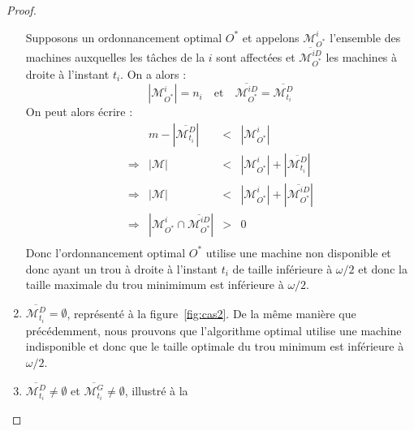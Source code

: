 \documentclass[a4paper,9pt]{article}
\begin{document}
\begin{proof}
\begin{bitemize}
\begin{enumerate}
                    Supposons un ordonnancement optimal $O^*$ et appelons
                    $\mathcal{M}_{O^*}^i$ l'ensemble des machines auxquelles les tâches de la
                    \tphase{} $i$ sont affectées et $\overline{\mathcal{M}_{O^*}^{iD}}$ les machines
                     à droite à l'instant $t_i$. On a alors :
                    \begin{displaymath}
                        |\mathcal{M}_{O^*}^i| = n_i \quad \mbox{et} \quad
                        \overline{\mathcal{M}_{O^*}^{iD}} = \overline{\mathcal{M}_{t_i}^D}
                    \end{displaymath}
                    On peut alors écrire :
                    \begin{displaymath}
                        \begin{array}{rrcl}
                            & m - |\overline{\mathcal{M}_{t_i}^D}| & < & |\mathcal{M}_{O^*}^i| \\
                            \Rightarrow & |\mathcal{M}| & < & |\mathcal{M}_{O^*}^i| +
                            |\overline{\mathcal{M}_{t_i}^D}| \\
                            \Rightarrow & |\mathcal{M}| & < & |\mathcal{M}_{O^*}^i| +
                            |\overline{\mathcal{M}_{O^*}^{iD}}| \\
                            \Rightarrow & |\mathcal{M}_{O^*}^i \cap
                            \overline{\mathcal{M}_{O^*}^{iD}}| & > & 0 \\
                        \end{array}
                    \end{displaymath}
                    Donc l'ordonnancement optimal $O^*$ utilise une machine non disponible et donc
                    ayant un trou à droite à l'instant $t_i$ de taille inférieure à $\omega / 2$ et
                    donc la taille maximale du trou minimimum est inférieure à
                    $\omega/2$.
                \item $\overline{\mathcal{M}_{t_i}^D} = \emptyset$, représenté à la
                    figure~\ref{fig:cas2}. De la même manière que précédemment, nous prouvons que
                    l'algorithme optimal utilise une machine indisponible et donc que le taille
                    optimale du trou minimum est inférieure à $\omega / 2$.
                \item $\overline{\mathcal{M}_{t_i}^D} \neq \emptyset$ et
                    $\overline{\mathcal{M}_{t_i}^G} \neq \emptyset$, illustré à la

\end{enumerate}
\end{bitemize}
\end{proof}
\end{document}
